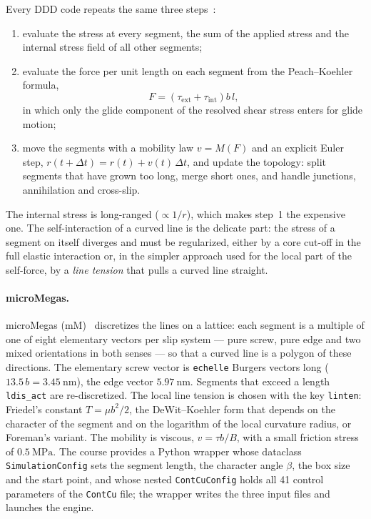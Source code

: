 \documentclass[11pt,a4paper]{article}
\numberwithin{equation}{section}
\theoremstyle{remark}
\begin{document}
Every DDD code repeats the same three steps~\citep{devincre2011}:
\begin{enumerate}\setlength{\itemsep}{1pt}
  \item evaluate the stress at every segment, the sum of the applied stress and the internal stress
    field of all other segments;
  \item evaluate the force per unit length on each segment from the Peach--Koehler formula,
    \begin{equation}\label{eq:pk}
      F = \left(\tau_{\mathrm{ext}} + \tau_{\mathrm{int}}\right)b\,l,
    \end{equation}
    in which only the glide component of the resolved shear stress enters for glide motion;
  \item move the segments with a mobility law $v = M(F)$ and an explicit Euler step,
    $r(t+\Delta t) = r(t) + v(t)\,\Delta t$, and update the topology: split segments that have grown
    too long, merge short ones, and handle junctions, annihilation and cross-slip.
\end{enumerate}
The internal stress is long-ranged ($\propto 1/r$), which makes step~1 the expensive one. The
self-interaction of a curved line is the delicate part: the stress of a segment on itself diverges and
must be regularized, either by a core cut-off in the full elastic interaction or, in the simpler
approach used for the local part of the self-force, by a \emph{line tension} that pulls a curved line
straight.

\paragraph{microMegas.}
microMegas (mM)~\citep{devincre2011} discretizes the lines on a lattice: each segment is a multiple of
one of eight elementary vectors per slip system --- pure screw, pure edge and two mixed orientations in
both senses --- so that a curved line is a polygon of these directions. The elementary screw vector is
\texttt{echelle} Burgers vectors long ($13.5\,b = \SI{3.45}{\nano\metre}$), the edge vector
$\SI{5.97}{\nano\metre}$. Segments that exceed a length \texttt{ldis\_act} are re-discretized. The local
line tension is chosen with the key \texttt{linten}: Friedel's constant $T = \mu b^2/2$, the DeWit--Koehler
form that depends on the character of the segment and on the logarithm of the local curvature radius,
or Foreman's variant. The mobility is viscous, $v = \tau b/B$, with a small friction stress of
$\SI{0.5}{\mega\pascal}$. The course provides a Python wrapper whose dataclass \texttt{SimulationConfig}
sets the segment length, the character angle $\beta$, the box size and the start point, and whose
nested \texttt{ContCuConfig} holds all 41 control parameters of the \texttt{ContCu} file; the wrapper
writes the three input files and launches the engine.
\end{document}
